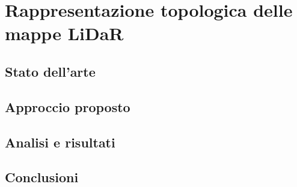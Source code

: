 \chapter{Rappresentazione topologica delle mappe LiDaR}


\section{Stato dell'arte}


\section{Approccio proposto}


\section{Analisi e risultati}


\section{Conclusioni}